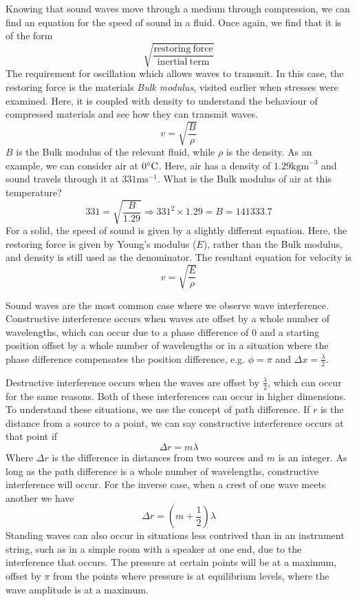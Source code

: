 \documentclass[12pt]{report}
\begin{document}
\begin{flushleft}
\bigskip
Knowing that sound waves move through a medium through compression, we can find
an equation for the speed of sound in a fluid. Once again, we find that it is 
of the form 
\[\sqrt{\frac{\mathrm{restoring\:force}}{\mathrm{inertial\:term}}}\]
The requirement for oscillation which allows waves to transmit. In this case, 
the restoring force is the materials \textit{Bulk modulus}, visited earlier 
when stresses were examined. Here, it is coupled with density to understand the
behaviour of compressed materials and see how they can transmit waves.
\[v = \sqrt{\frac{B}{\rho}}\]
\(B\) is the Bulk modulus of the relevant fluid, while \(\rho\) is the density.
As an example, we can consider air at \(0\degree\mathrm{C}\). Here, air has a
density of \(1.29\mathrm{kgm}^{-3}\) and sound travels through it at
\(331\mathrm{ms}^{-1}\). What is the Bulk modulus of air at this temperature?
\[331 = \sqrt{\frac{B}{1.29}} \Rightarrow 331^2\times1.29 = B = 141333.7\]
For a solid, the speed of sound is given by a slightly different equation. 
Here, the restoring force is given by Young's modulus (\(E\)), rather than the
Bulk  modulus, and density is still used as the denominator. The resultant 
equation for velocity is
\[v = \sqrt{\frac{E}{\rho}}\]

\bigskip
Sound waves are the most common case where we observe wave interference. 
Constructive interference occurs when waves are offset by a whole number of
wavelengths, which can occur due to a phase difference of \(0\) and a starting
position offset by a whole number of wavelengths or in a situation where the
phase difference compensates the position difference, e.g. \(\phi = \pi\) and
\(\Delta x = \frac{\lambda}{2}\).

\bigskip
Destructive interference occurs when the waves are offset by 
\(\frac{\lambda}{2}\), which can occur for the same reasons. Both of these
interferences can occur in higher dimensions. To understand these situations,
we use the concept of path difference. If \(r\) is the distance from a source
to a point, we can say constructive interference occurs at that point if
\[\Delta r = m\lambda\]
Where \(\Delta r\) is the difference in distances from two sources and \(m\) is
an integer. As long as the path difference is a whole number of wavelengths, 
constructive interference will occur. For the inverse case, when a crest of
one wave meets another we have
\[\Delta r = \left(m + \frac{1}{2}\right)\lambda\]
Standing waves can also occur in situations less contrived than in an 
instrument string, such as in a simple room with a speaker at one end, due to
the interference that occurs. The pressure at certain points will be at a 
maximum, offset by \(\pi\) from the points where pressure is at equilibrium
levels, where the wave amplitude is at a maximum.


\end{flushleft}
\end{document}
